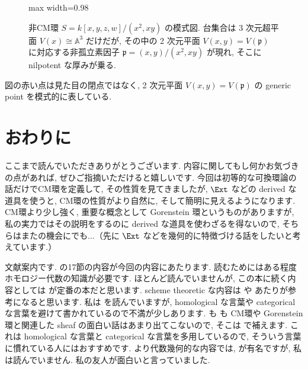 \documentclass[article,paper=b5paper]{jlreq}
\begin{document}
\begin{figure}[H]
\begin{adjustbox}{max width=0.98\linewidth}
    \end{adjustbox}
    \caption{非CM環 $S=k[x,y,z,w]/(x^2,xy)$ の模式図. 台集合は 3 次元超平面 $V(x)\cong \mathbb{A}^3$ だけだが, その中の 2 次元平面 $V(x,y)=V(\mathfrak{p})$ に対応する非孤立素因子 $\mathfrak{p}=(x,y)/(x^2,xy)$ が現れ, そこに nilpotent な厚みが乗る.}
\end{figure}

図の赤い点は見た目の閉点ではなく, 2 次元平面 $V(x,y)=V(\mathfrak{p})$ の generic point を模式的に表している.

\section*{おわりに}

ここまで読んでいただきありがとうございます. 内容に関してもし何かお気づきの点があれば, ぜひご指摘いただけると嬉しいです. 今回は初等的な可換環論の話だけでCM環を定義して, その性質を見てきましたが, $\Ext$ などの derived な道具を使うと, CM環の性質がより自然に, そして簡明に見えるようになります. CM環より少し強く, 重要な概念として Gorenstein 環というものがありますが, 私の実力ではその説明をするのに derived な道具を使わざるを得ないので, そちらはまたの機会にでも...（先に $\Ext$ などを幾何的に特徴づける話をしたいと考えています.）

文献案内です. \cite{Matsumura} の17節の内容が今回の内容にあたります. 読むためにはある程度ホモロジー代数の知識が必要です. ほとんど読んでいませんが, この本に続く内容としては \cite{BrunsHerzog} が定番の本だと思います. scheme theoretic な内容は \cite{Liu} や \cite{Hartshorne} あたりが参考になると思います. 私は \cite{Liu} を読んでいますが, homological な言葉や categorical な言葉を避けて書かれているので不満が少しあります. \cite{Liu} も \cite{Hartshorne} も CM環や Gorenstein 環と関連した sheaf の面白い話はあまり出てこないので, そこは \cite{GoertzWedhorn} で補えます. これは homological な言葉と categorical な言葉を多用しているので, そういう言葉に慣れている人にはおすすめです. より代数幾何的な内容では, \cite{Badescu} が有名ですが, 私は読んでいません. 私の友人が面白いと言っていました.
\end{document}
